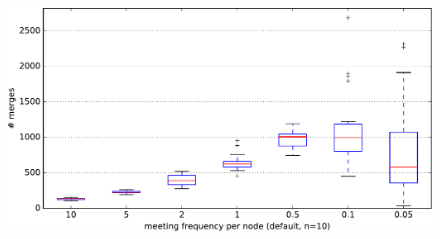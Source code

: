 \documentclass[final,hyperref={pdfpagelabels=false}]{beamer}
\begin{document}
\begin{frame}
\begin{columns}
\begin{column}{.9\textwidth}
\begin{columns}
\begin{column}{.3\textwidth}
    \begin{figure}
      \includegraphics[width=\linewidth]{fig/dumb_meeting_frequency_n=10.pdf}
    \end{figure}
  \end{column}
  \end{columns}


\end{column}
\end{columns}
\end{frame}
\end{document}
